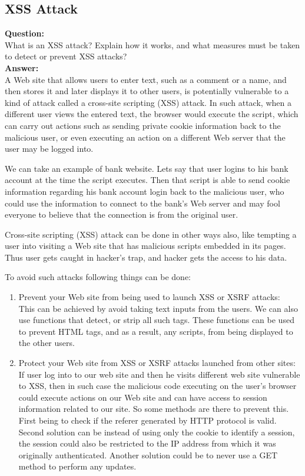 \documentclass[12pt]{article}
\begin{document}
\subsection*{XSS Attack}
\textbf{Question:} \\ 
What is an XSS attack? Explain how it works, and what measures must be taken to detect or prevent XSS attacks?
\\

\noindent
\textbf{Answer: } \\ 
A Web site that allows users to enter text, such as a comment or a name, and then stores it and later displays it to other users, is potentially vulnerable to a kind of attack called a cross-site scripting (XSS) attack. In such attack, when a different user views the entered text, the browser would execute the script, which can carry out actions such as sending private cookie information back to the malicious user, or even executing an action on a different Web server that the user may be logged into.

We can take an example of bank website. Lets say that user logins to his bank account at the time the script executes. Then that script is able to send cookie information regarding his bank account login back to the malicious user, who could use the information to connect to the bank’s Web server and may fool everyone to believe that the connection is from the original user.

Cross-site scripting (XSS) attack can be done in other ways also, like tempting a user into visiting a Web site that has malicious scripts embedded in its pages. Thus user gets caught in hacker's trap, and hacker gets the access to his data. 

To avoid such attacks following things can be done:
\begin{enumerate}
    \item Prevent your Web site from being used to launch XSS or XSRF attacks: \\
        This can be achieved by avoid taking text inputs from the users. We can also use functions that detect, or strip all such tags. These functions can be used to prevent HTML tags, and as a result, any scripts, from being displayed to the other users.
    
    \item Protect your Web site from XSS or XSRF attacks launched from other sites: \\
        If user log into to our web site and then he visits different web site  vulnerable to XSS, then in such case the malicious code executing on the user’s browser could execute actions on our Web site and can have access to session information related to our site. So some methods are there to prevent this.
        First being to check if the referer generated by HTTP protocol is valid. Second solution can be instead of using only the cookie to identify a session, the session could also be restricted to the IP address from which it was originally authenticated. Another solution could be to never use a GET method to perform any updates. 
\end{enumerate}
\singlespacing
\end{document}
